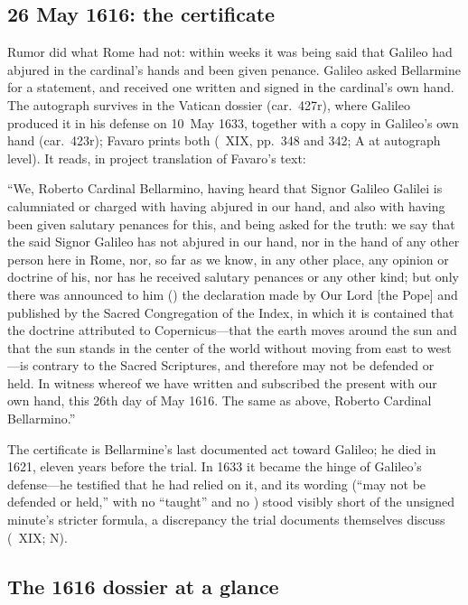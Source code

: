 \subsection{26 May 1616: the certificate}

Rumor did what Rome had not: within weeks it was being said that
Galileo had abjured in the cardinal's hands and been given
penance. Galileo asked Bellarmine for a statement, and received
one written and signed in the cardinal's own hand. The autograph
survives in the Vatican dossier (car.\ 427r), where Galileo
produced it in his defense on 10~May 1633, together with a copy
in Galileo's own hand (car.\ 423r); Favaro prints both
(~XIX, pp.~348 and 342; A at autograph level). It
reads, in project translation of Favaro's text:

\begin{studyframe}\small
``We, Roberto Cardinal Bellarmino, having heard that Signor
Galileo Galilei is calumniated or charged with having abjured in
our hand, and also with having been given salutary penances for
this, and being asked for the truth: we say that the said Signor
Galileo has not abjured in our hand, nor in the hand of any other
person here in Rome, nor, so far as we know, in any other place,
any opinion or doctrine of his, nor has he received salutary
penances or any other kind; but only there was announced to him
() the declaration made by Our Lord
[the Pope] and published by the Sacred Congregation of the Index,
in which it is contained that the doctrine attributed to
Copernicus---that the earth moves around the sun and that the sun
stands in the center of the world without moving from east to
west---is contrary to the Sacred Scriptures, and therefore may not
be defended or held. In witness whereof we have written and
subscribed the present with our own hand, this 26th day of May
1616. The same as above, Roberto Cardinal Bellarmino.''
\end{studyframe}

The certificate is Bellarmine's last documented act toward
Galileo; he died in 1621, eleven years before the trial. In 1633
it became the hinge of Galileo's defense---he testified that he
had relied on it, and its wording (``may not be defended or
held,'' with no ``taught'' and no ) stood
visibly short of the unsigned minute's stricter formula, a
discrepancy the trial documents themselves discuss
(~XIX; N).

\subsection{The 1616 dossier at a glance}

